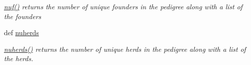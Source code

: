 \begin{DoxyCompactItemize}
\begin{DoxyCompactList}\small\item\em \hyperlink{classPyPedal_1_1pyp__newclasses_1_1PedigreeMetadata_a2fa68d278b69bda83c344c5f0615e25c}{nuf()} returns the number of unique founders in the pedigree along with a list of the founders \end{DoxyCompactList}\item 
def \hyperlink{classPyPedal_1_1pyp__newclasses_1_1PedigreeMetadata_ae408f6ef90563175d0069238dfd55f1b}{nuherds}
\begin{DoxyCompactList}\small\item\em \hyperlink{classPyPedal_1_1pyp__newclasses_1_1PedigreeMetadata_ae408f6ef90563175d0069238dfd55f1b}{nuherds()} returns the number of unique herds in the pedigree along with a list of the herds. \end{DoxyCompactList}\end{DoxyCompactItemize}
